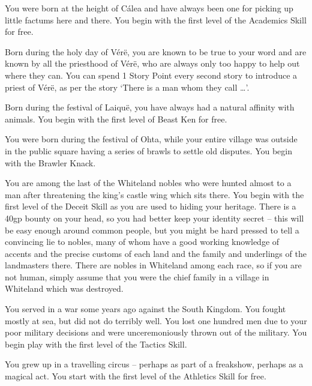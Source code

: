\begin{list}{\addtocounter{list}{1}\textbf{:}}{\raggedleft}
\item{You were born at the height of C\'{a}lea and have always been one for picking up little factums here and there.  You begin with the first level of the Academics Skill for free.}

\item{Born during the holy day of V\'{e}r\"{e}, you are known to be true to your word and are known by all the priesthood of V\'{e}r\"{e}, who are always only too happy to help out where they can.  You can spend 1 Story Point every second story to introduce a priest of V\'{e}r\"{e}, as per the story `There is a man whom they call \ldots'.}

\item{Born during the festival of Laiqu\"{e}, you have always had a natural affinity with animals.  You begin with the first level of Beast Ken for free.}

\item{You were born during the festival of Ohta, while your entire village was outside in the public square having a series of brawls to settle old disputes.  You begin with the Brawler Knack.}

\item{You are among the last of the Whiteland nobles who were hunted almost to a man after threatening the king's castle wing which sits there.  You begin with the first level of the Deceit Skill as you are used to hiding your heritage.  There is a 40gp bounty on your head, so you had better keep your identity secret -- this will be easy enough around common people, but you might be hard pressed to tell a convincing lie to nobles, many of whom have a good working knowledge of accents and the precise customs of each land and the family and underlings of the landmasters there.  There are nobles in Whiteland among each race, so if you are not human, simply assume that you were the chief family in a village in Whiteland which was destroyed.}

\item{You served in a war some years ago against the South Kingdom.  You fought mostly at sea, but did not do terribly well.  You lost one hundred men due to your poor military decisions and were unceremoniously thrown out of the military.  You begin play with the first level of the Tactics Skill.}

\item{You grew up in a travelling circus -- perhaps as part of a freakshow, perhaps as a magical act.  You start with the first level of the Athletics Skill for free.}


\end{list}
